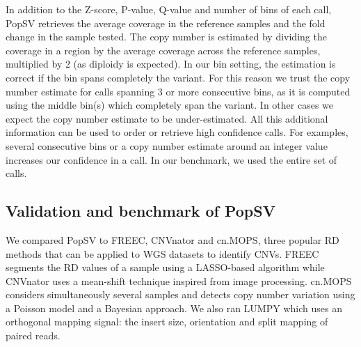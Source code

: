 In addition to the Z-score, P-value, Q-value and number of bins of each call, {\sf PopSV} retrieves the average coverage in the reference samples and the fold change in the sample tested. The copy number is estimated by dividing the coverage in a region by the average coverage across the reference samples, multiplied by 2 (as diploidy is expected). In our bin setting, the estimation is correct if the bin spans completely the variant. For this reason we trust the copy number estimate for calls spanning 3 or more consecutive bins, as it is computed using the middle bin(s) which completely span the variant. In other cases we expect the copy number estimate to be under-estimated.
All this additional information can be used to order or retrieve high confidence calls. For examples, several consecutive bins or a copy number estimate around an integer value increases our confidence in a call. In our benchmark, we used the entire set of calls.

\subsection*{Validation and benchmark of {\sf PopSV}}

We compared {\sf PopSV} to {\sf FREEC}\citep{Boeva2011}, {\sf CNVnator}\citep{Abyzov2011} and {\sf cn.MOPS}\citep{Klambauer2012}, three popular RD methods that can be applied to WGS datasets to identify CNVs. {\sf FREEC} segments the RD values of a sample using a LASSO-based algorithm while {\sf CNVnator} uses a mean-shift technique inspired from image processing. {\sf cn.MOPS} considers simultaneously several samples and detects copy number variation using a Poisson model and a Bayesian approach. We also ran {\sf LUMPY}\citep{Layer2012} which uses an orthogonal mapping signal: the insert size, orientation and split mapping of paired reads.

